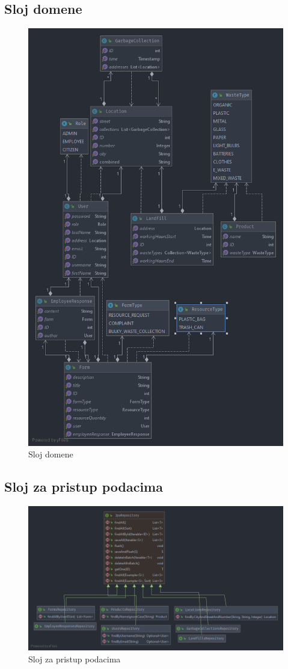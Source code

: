 		\subsection{Sloj domene}
		\begin{figure}[H]
			\includegraphics[width=0.7\linewidth]{slike/modelSloj.png}
			\centering
			\caption{Sloj domene}
			\label{fig:sloj_domene}
		\end{figure}
	
		\subsection{Sloj za pristup podacima }
		\begin{figure}[H]
			\includegraphics[width=\linewidth]{slike/daoSloj.png}
			\centering
			\caption{Sloj za pristup podacima}
			\label{fig:dao_sloj}
		\end{figure}
	
